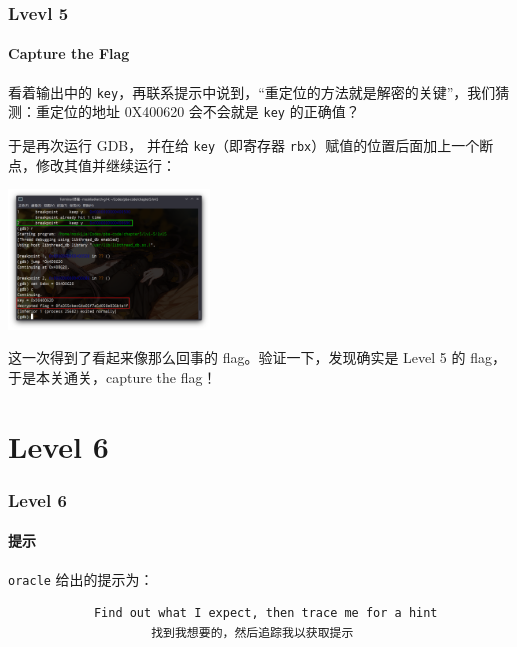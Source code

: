 \documentclass{ctexbeamer}
\begin{document}
    \begin{frame}
        \frametitle{Lvevl 5}
        \framesubtitle{Capture the Flag}
    
        看着输出中的 \texttt{key}，再联系提示中说到，``重定位的方法就是解密的关键''，我们猜测：重定位的地址 0X400620 会不会就是 \texttt{key} 的正确值？

        于是再次运行 GDB， 并在给 \texttt{key}（即寄存器 \texttt{rbx}）赋值的位置后面加上一个断点，修改其值并继续运行：

        \begin{center}
            \includegraphics[width=0.4\textwidth]{pics/lvl5-gdb-2.png}
        \end{center}

        这一次得到了看起来像那么回事的 flag。验证一下，发现确实是 Level 5 的 flag，于是本关通关，capture the flag！
    
    \end{frame}

    \section{Level 6}

    \begin{frame}[fragile]
        \frametitle{Level 6}
        \framesubtitle{提示}
    
        \texttt{oracle} 给出的提示为：

        \begin{verbatim}
            Find out what I expect, then trace me for a hint
                    找到我想要的，然后追踪我以获取提示
        \end{verbatim}
    
    \end{frame}
\end{document}
